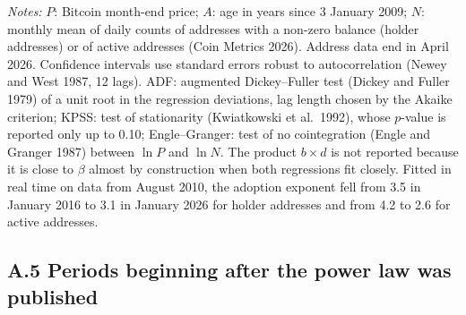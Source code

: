 \documentclass[12pt]{article}
\theoremstyle{plain}
\theoremstyle{remark}
\begin{document}
\begin{table}[H]
\par\smallskip
\begin{minipage}{\textwidth}\footnotesize
\emph{Notes:} $P$: Bitcoin month-end price; $A$: age in years since 3 January 2009; $N$: monthly mean of daily counts of addresses with a non-zero balance (holder addresses) or of active addresses (Coin Metrics 2026). Address data end in April 2026. Confidence intervals use standard errors robust to autocorrelation (Newey and West 1987, 12 lags). ADF: augmented Dickey--Fuller test (Dickey and Fuller 1979) of a unit root in the regression deviations, lag length chosen by the Akaike criterion; KPSS: test of stationarity (Kwiatkowski et al.\ 1992), whose $p$-value is reported only up to 0.10; Engle--Granger: test of no cointegration (Engle and Granger 1987) between $\ln P$ and $\ln N$. The product $b\times d$ is not reported because it is close to $\beta$ almost by construction when both regressions fit closely. Fitted in real time on data from August 2010, the adoption exponent fell from 3.5 in January 2016 to 3.1 in January 2026 for holder addresses and from 4.2 to 2.6 for active addresses.
\end{minipage}
\end{table}

\subsection*{A.5 Periods beginning after the power law was published}
\end{document}
